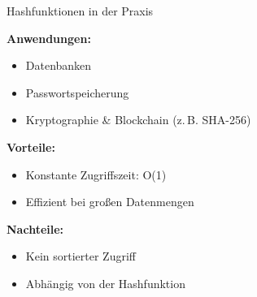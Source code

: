 \documentclass[aspectratio=169,xcolor=dvipsnames, t]{beamer}
\begin{document}
\begin{frame}{Hashfunktionen in der Praxis}

\textbf{Anwendungen:}
\begin{itemize}
    \item Datenbanken
    \item Passwortspeicherung
    \item Kryptographie \& Blockchain (z.\,B. SHA-256)
\end{itemize}

\vspace{0.8em}

\textbf{Vorteile:}
\begin{itemize}
    \item[+] Konstante Zugriffszeit: O(1)
    \item[+] Effizient bei großen Datenmengen
\end{itemize}

\vspace{0.8em}

\textbf{Nachteile:}
\begin{itemize}
    \item[-] Kein sortierter Zugriff
    \item[-] Abhängig von der Hashfunktion
\end{itemize}

\end{frame}
\end{document}
